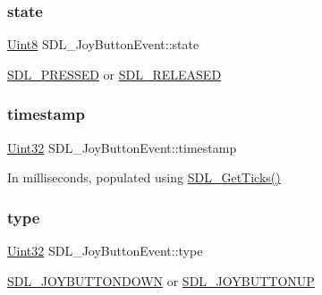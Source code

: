 \subsubsection{\texorpdfstring{state}{state}}
{\footnotesize\ttfamily \mbox{\hyperlink{_s_d_l__stdinc_8h_a2944638813a090aa23e62f4da842c3e2}{Uint8}} S\+D\+L\+\_\+\+Joy\+Button\+Event\+::state}

\mbox{\hyperlink{_s_d_l__events_8h_aee81bbffbc8489bdea8fecd1232c4bd1}{S\+D\+L\+\_\+\+P\+R\+E\+S\+S\+ED}} or \mbox{\hyperlink{_s_d_l__events_8h_ad680a069f9fcab80de91b3eefdf29c3c}{S\+D\+L\+\_\+\+R\+E\+L\+E\+A\+S\+ED}} \mbox{\label{struct_s_d_l___joy_button_event_ab50b6f7d1ab3ac53df69fc2d6cf5fa2a}} 
\subsubsection{\texorpdfstring{timestamp}{timestamp}}
{\footnotesize\ttfamily \mbox{\hyperlink{_s_d_l__stdinc_8h_add440eff171ea5f55cb00c4a9ab8672d}{Uint32}} S\+D\+L\+\_\+\+Joy\+Button\+Event\+::timestamp}

In milliseconds, populated using \mbox{\hyperlink{_s_d_l__timer_8h_a0b9bc71d6287e0ffafdc3419760fe2b3}{S\+D\+L\+\_\+\+Get\+Ticks()}} \mbox{\label{struct_s_d_l___joy_button_event_a8f3312a046d37fa2884b93f69c4cb655}} 
\subsubsection{\texorpdfstring{type}{type}}
{\footnotesize\ttfamily \mbox{\hyperlink{_s_d_l__stdinc_8h_add440eff171ea5f55cb00c4a9ab8672d}{Uint32}} S\+D\+L\+\_\+\+Joy\+Button\+Event\+::type}

\mbox{\hyperlink{_s_d_l__events_8h_a3b589e89be6b35c02e0dd34a55f3fccaa386ac978bc145a45883fe0adab70710b}{S\+D\+L\+\_\+\+J\+O\+Y\+B\+U\+T\+T\+O\+N\+D\+O\+WN}} or \mbox{\hyperlink{_s_d_l__events_8h_a3b589e89be6b35c02e0dd34a55f3fccaa76f91c81110f012e3a47cbbc0449e3c3}{S\+D\+L\+\_\+\+J\+O\+Y\+B\+U\+T\+T\+O\+N\+UP}} \mbox{\label{struct_s_d_l___joy_button_event_a1679049adad7242b28420948fdc79044}} 
